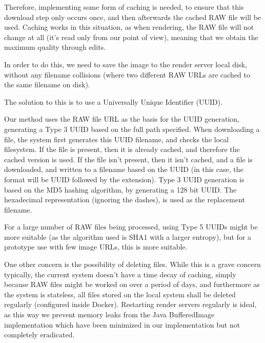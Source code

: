 \documentclass[10pt,a4paper]{article}
\begin{document}
Therefore, implementing some form of caching is needed, to ensure that this download step only occurs once,
and then afterwards the cached RAW file will be used. Caching works in this situation, as when rendering,
the RAW file will not change at all (it's read only from our point of view), meaning that we obtain the
maximum quality through edits.

In order to do this, we need to save the image to the render server local disk, without any filename collisions
(where two different RAW URLs are cached to the same filename on disk).

The solution to this is to use a Universally Unique Identifier (UUID).

Our method uses the RAW file URL as the basis for the UUID generation, generating a Type 3 UUID based on the full path specified.
When downloading a file, the system first generates this UUID filename, and checks the local filesystem. If the file is present, then it
is already cached, and therefore the cached version is used. If the file isn't present, then it isn't cached, and a file is downloaded, and 
written to a filename based on the UUID (in this case, the format will be UUID followed by the extension). Type 3 UUID generation is based on
the MD5 hashing algorithm, by generating a 128 bit UUID. The hexadecimal representation (ignoring the dashes), is used as the replacement filename.


For a large number of RAW files being processed, using Type 5 UUIDs might be more suitable (as the algorithm used is SHA1 with a larger entropy), but
for a prototype use with few image URLs, this is more suitable.

One other concern is the possibility of deleting files. While this is a grave concern typically, the current system doesn't have a time decay of caching,
simply because RAW files might be worked on over a period of days, and furthermore as the system is stateless, all files stored on the local system shall be
deleted regularly (configured inside Docker). Restarting render servers regularly is ideal, as this way we prevent memory leaks from the Java BufferedImage implementation
which have been minimized in our implementation but not completely eradicated.
\end{document}
